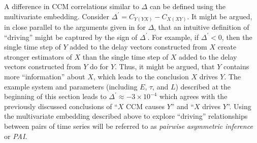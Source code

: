 \documentclass[twocolumn,aps,pre,groupedaddress]{revtex4-1}
\begin{document}
A difference in CCM correlations similar to $\Delta$ can be defined using the multivariate embedding.  Consider $\Delta^\prime = C_{Y(YX)} - C_{X(XY)}$.  It might be argued, in close parallel to the arguments given in \cite{Sugihara2012} for $\Delta$, that an intuitive definition of ``driving'' might be captured by the sign of $\Delta^\prime$.  For example, if $\Delta^\prime<0$, then the single time step of $Y$ added to the delay vectors constructed from $X$ create stronger estimators of $X$ than the single time step of $X$ added to the delay vectors constructed from $Y$ do for $Y$.  Thus, it might be argued, that $Y$ contains more ``information'' about $X$, which leads to the conclusion $X$ drives $Y$.  The example system and parameters (including $E$, $\tau$, and $L$) described at the beginning of this section leads to $\Delta^\prime \approx -3\times 10^{-4}$ which agrees with the previously discussed conclusions of ``$X$ CCM causes $Y$'' and ``$X$ drives $Y$''.  Using the multivariate embedding described above to explore ``driving'' relationships between pairs of time series will be referred to as {\em pairwise asymmetric inference} or {\em PAI}.  
\end{document}
